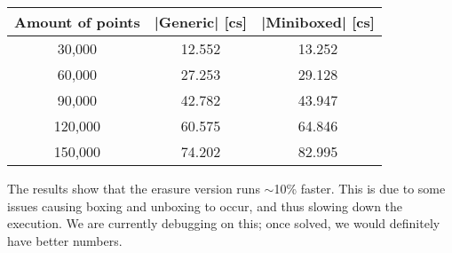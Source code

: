 \begin{center}
\begin{tabular}{ |c|c|c| } 
 \hline
 Amount of points & |Generic| [cs] & |Miniboxed| [cs] \\ 
 \hline
 30,000 & 12.552 & 13.252 \\
 60,000 & 27.253 & 29.128 \\
 90,000 & 42.782 & 43.947 \\
 120,000 & 60.575 & 64.846 \\
 150,000 & 74.202 & 82.995 \\
 \hline
\end{tabular}
\end{center}

The results show that the erasure version runs $\sim$10\% faster. This is due to some issues causing boxing and unboxing to occur, and thus slowing down the execution. We are currently debugging on this; once solved, we would definitely have better numbers.
